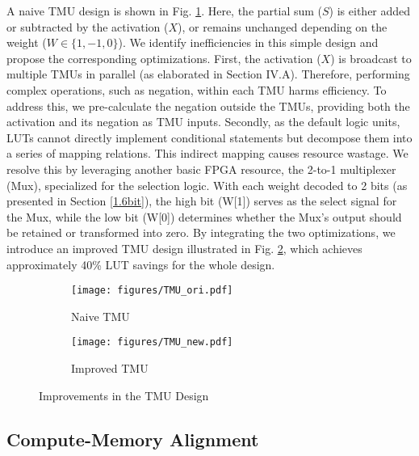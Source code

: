 A naive TMU design is shown in Fig. \ref{fig:TMU_ori}. Here, the partial sum ($S$) is either added or subtracted by the activation ($X$), or remains unchanged depending on the weight ($W \in \{1,-1,0\}$). We identify inefficiencies in this simple design and propose the corresponding optimizations. First, the activation ($X$) is broadcast to multiple TMUs in parallel (as elaborated in Section IV.A). Therefore, performing complex operations, such as negation, within each TMU harms efficiency. To address this, we pre-calculate the negation outside the TMUs, providing both the activation and its negation as TMU inputs. Secondly, as the default logic units, LUTs cannot directly implement conditional statements but decompose them into a series of mapping relations. This indirect mapping causes resource wastage. We resolve this by leveraging another basic FPGA resource, the 2-to-1 multiplexer (Mux), specialized for the selection logic. With each weight decoded to 2 bits (as presented in Section \ref{1.6bit}), the high bit (W[1]) serves as the select signal for the Mux, while the low bit (W[0]) determines whether the Mux's output should be retained or transformed into zero. By integrating the two optimizations, we introduce an improved TMU design illustrated in Fig. \ref{fig:TMU_new}, which achieves approximately 40\% LUT savings for the whole design.
\begin{figure}[h]
    \vspace{-1mm}
    \centering
    \begin{subfigure}[b]{0.14\textwidth}
        \centering
        \texttt{[image: figures/TMU\_ori.pdf]}
        \caption{Naive TMU}
        \label{fig:TMU_ori}
    \end{subfigure}
    \hspace{15mm}
    \begin{subfigure}[b]{0.14\textwidth}
        \centering
        \texttt{[image: figures/TMU\_new.pdf]}
        \caption{Improved TMU}
        \label{fig:TMU_new}
    \end{subfigure}
    \caption{Improvements in the TMU Design}
    \label{fig:TMU}
    \vspace{-4.5mm}
\end{figure}



\vspace{-1.5mm}
\subsection{Compute-Memory Alignment}
\label{sec:Compute-Memory Alignment}


